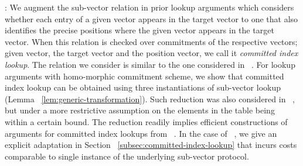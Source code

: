\documentclass[sigconf]{acmart}
\begin{document}
: We augment the sub-vector relation in prior lookup arguments which
considers whether each entry of a given vector appears in the target vector to one that also identifies
the precise positions where the given vector appears in the target vector. When this relation is checked
over commitments of the respective vectors; given vector, the target vector and the position vector, we call
it {\em committed index lookup}. The relation we consider is similar to the one considered in ~\cite{lasso}.
For lookup arguments with homo-morphic commitment scheme, we show that committed index lookup can be obtained
using three instantiations of sub-vector lookup (Lemma ~\ref{lem:generic-transformation}). Such reduction was
also considered in ~\cite{lasso}, but under a more restrictive assumption on the elements in the table being
within a certain bound. The reduction readily implies
efficient constructions of arguments for committed index lookups from
~\cite{CCS:ZBKMNS22,EPRINT:PosKat22,EPRINT:ZGKMR22,EPRINT:EagFioGab22}.
In the case of ~\cite{EPRINT:PosKat22}, we give an explicit adaptation in
Section ~\ref{subsec:committed-index-lookup} that incurs costs comparable to single instance of the underlying sub-vector
protocol.\smallskip
\end{document}
